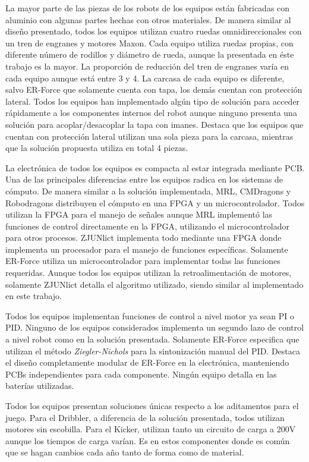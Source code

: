 La mayor parte de las piezas de los robots de los equipos están fabricadas con aluminio con algunas partes hechas con otros materiales. De manera similar al diseño presentado, todos los equipos utilizan cuatro ruedas omnidireccionales con un tren de engranes y motores Maxon. Cada equipo utiliza ruedas propias, con diferente número de rodillos y diámetro de rueda, aunque la presentada en éste trabajo es la mayor. La proporción de reducción del tren de engranes varía en cada equipo aunque está entre 3 y 4. La carcasa de cada equipo es diferente, salvo ER-Force que solamente cuenta con tapa, los demás cuentan con protección lateral. Todos los equipos han implementado algún tipo de solución para acceder rápidamente a los componentes internos del robot aunque ninguno presenta una solución para acoplar/desacoplar la tapa con imanes. Destaca que los equipos que cuentan con protección lateral utilizan una sola pieza para la carcasa, mientras que la solución propuesta utiliza en total 4 piezas. 


La electrónica de todos los equipos es compacta al estar integrada mediante \gls{PCB}. Una de las principales diferencias entre los equipos radica en los sistemas de cómputo. De manera similar a la solución implementada, MRL, CMDragons y Robodragons distribuyen el cómputo en una FPGA y un microcontrolador. Todos utilizan la FPGA para el manejo de señales aunque MRL implementó las funciones de control directamente en la FPGA, utilizando el microcontrolador para otros procesos. ZJUNlict implementa todo mediante una FPGA donde implementa un procesador para el manejo de funciones específicas. Solamente ER-Force utiliza un microcontrolador para implementar todas las funciones requeridas. Aunque todos los equipos utilizan la retroalimentación de motores, solamente ZJUNlict detalla el algoritmo utilizado, siendo similar al implementado en este trabajo. 

Todos los equipos implementan funciones de control a nivel motor ya sean PI o PID. Ninguno de los equipos considerados implementa un segundo lazo de control a nivel robot como en la solución presentada. Solamente ER-Force especifica que utilizan el método \textit{Ziegler-Nichols} para la sintonización manual del PID. Destaca el diseño completamente modular de ER-Force en la electrónica, manteniendo \gls{PCB}s independientes para cada componente. Ningún equipo detalla en las baterías utilizadas.

Todos los equipos presentan soluciones únicas respecto a los aditamentos para el juego. Para el \gls{Dribbler}, a diferencia de la solución presentada, todos utilizan motores sin escobilla. Para el \gls{Kicker}, utilizan tanto un circuito de carga a 200V aunque los tiempos de carga varían. Es en estos componentes donde es común que se hagan cambios cada año tanto de forma como de material. 

